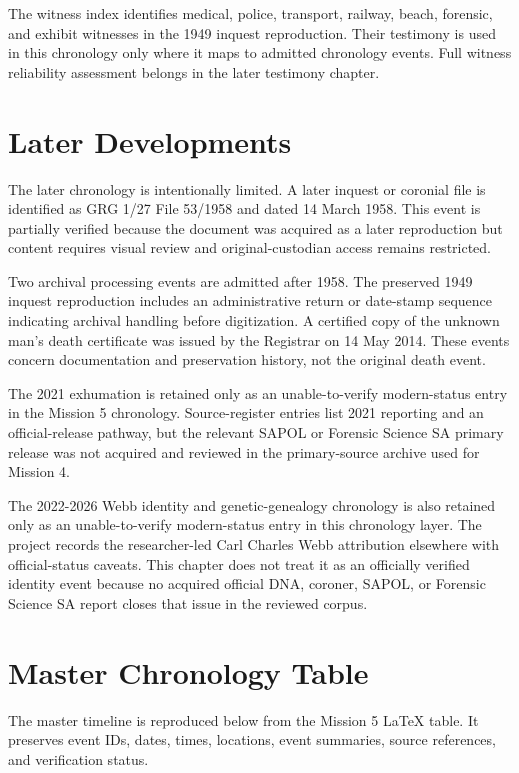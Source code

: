 The witness index identifies medical, police, transport, railway, beach, forensic, and exhibit witnesses in the 1949 inquest reproduction. Their testimony is used in this chronology only where it maps to admitted chronology events. Full witness reliability assessment belongs in the later testimony chapter.

\section{Later Developments}

The later chronology is intentionally limited. A later inquest or coronial file is identified as GRG 1/27 File 53/1958 and dated 14 March 1958. This event is partially verified because the document was acquired as a later reproduction but content requires visual review and original-custodian access remains restricted.

Two archival processing events are admitted after 1958. The preserved 1949 inquest reproduction includes an administrative return or date-stamp sequence indicating archival handling before digitization. A certified copy of the unknown man's death certificate was issued by the Registrar on 14 May 2014. These events concern documentation and preservation history, not the original death event.

The 2021 exhumation is retained only as an unable-to-verify modern-status entry in the Mission 5 chronology. Source-register entries list 2021 reporting and an official-release pathway, but the relevant SAPOL or Forensic Science SA primary release was not acquired and reviewed in the primary-source archive used for Mission 4.

The 2022-2026 Webb identity and genetic-genealogy chronology is also retained only as an unable-to-verify modern-status entry in this chronology layer. The project records the researcher-led Carl Charles Webb attribution elsewhere with official-status caveats. This chapter does not treat it as an officially verified identity event because no acquired official DNA, coroner, SAPOL, or Forensic Science SA report closes that issue in the reviewed corpus.

\section*{Master Chronology Table}

The master timeline is reproduced below from the Mission 5 LaTeX table. It preserves event IDs, dates, times, locations, event summaries, source references, and verification status.

